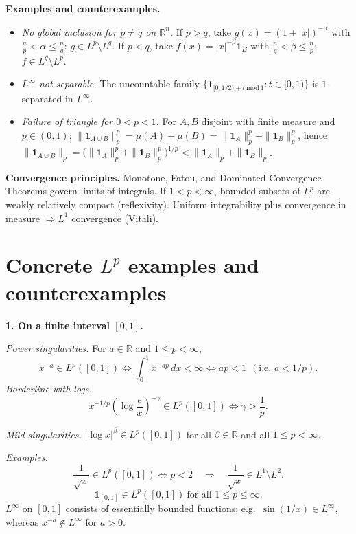 \documentclass[12pt,a4paper]{article}
\theoremstyle{plain}
\theoremstyle{definition}
\theoremstyle{remark}
\theoremstyle{remark}
\newenvironment{spacy}{\begingroup\setlength{\parskip}{6pt}\setlength{\parindent}{0pt}}{\endgroup}
\theoremstyle{definition}
\begin{document}
\begin{spacy}
	\medskip
	\textbf{Examples and counterexamples.}
	\begin{itemize}
		\item \emph{No global inclusion for $p\ne q$ on $\mathbb R^n$.}
		If $p>q$, take $g(x)=(1+|x|)^{-\alpha}$ with $\tfrac{n}{p}<\alpha\le\tfrac{n}{q}$:
		$g\in L^p\setminus L^q$.
		If $p<q$, take $f(x)=|x|^{-\beta}\mathbf 1_{B}$ with $\tfrac{n}{q}<\beta\le\tfrac{n}{p}$:
		$f\in L^q\setminus L^p$.
		\item \emph{$L^\infty$ not separable.}
		The uncountable family $\{\mathbf 1_{[0,1/2)+t\ \mathrm{mod}\ 1}:t\in[0,1)\}$ is $1$-separated in $L^\infty$.
		\item \emph{Failure of triangle for $0<p<1$.}
		For $A,B$ disjoint with finite measure and $p\in(0,1)$:
		$\|\mathbf 1_{A\cup B}\|_p^p=\mu(A)+\mu(B)=\|\mathbf 1_A\|_p^p+\|\mathbf 1_B\|_p^p$,
		hence $\|\mathbf 1_{A\cup B}\|_p=\big(\|\mathbf 1_A\|_p^p+\|\mathbf 1_B\|_p^p\big)^{1/p}
		< \|\mathbf 1_A\|_p+\|\mathbf 1_B\|_p$.
	\end{itemize}
	
	\textbf{Convergence principles.}
	Monotone, Fatou, and Dominated Convergence Theorems govern limits of integrals.
	If $1<p<\infty$, bounded subsets of $L^p$ are weakly relatively compact (reflexivity).
	Uniform integrability plus convergence in measure $\Rightarrow L^1$ convergence (Vitali).
	
\end{spacy}

	\section*{Concrete $L^p$ examples and counterexamples}
	
	\bigskip
	\textbf{1. On a finite interval $[0,1]$.}
	
	\medskip
	\emph{Power singularities.}
	For $a\in\mathbb{R}$ and $1\le p<\infty$,
	\[
	x^{-a}\in L^p([0,1])
	\iff \int_0^1 x^{-ap}\,dx <\infty
	\iff ap<1 \ \ (\text{i.e.\ } a<1/p).
	\]
	\emph{Borderline with logs.}
	\[
	x^{-1/p}\!\left(\log\frac{e}{x}\right)^{-\gamma}\in L^p([0,1])
	\iff \gamma>\frac1p.
	\]
	
	\medskip
	\emph{Mild singularities.}
	$|\log x|^\beta\in L^p([0,1])$ for all $\beta\in\mathbb{R}$ and all $1\le p<\infty$.
	
	\medskip
	\emph{Examples.}
	\[
	\frac{1}{\sqrt{x}}\in L^p([0,1]) \iff p<2
	\quad\Rightarrow\quad
	\frac{1}{\sqrt{x}}\in L^1\setminus L^2.
	\]
	\[
	\mathbf 1_{[0,1]}\in L^p([0,1]) \ \text{for all } 1\le p\le\infty.
	\]
	$L^\infty$ on $[0,1]$ consists of essentially bounded functions; e.g.\ $\sin(1/x)\in L^\infty$,
	whereas $x^{-a}\notin L^\infty$ for $a>0$.
	
\end{document}
